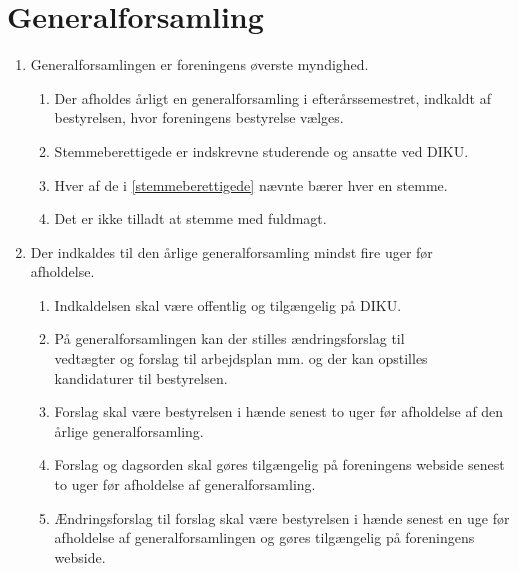 \documentclass[a4paper]{article}
\newenvironment{stykenum}{
  \begin{enumerate}[%
    label=Stk.~\arabic*., ref=\theenumi~Stk.~\arabic*, start=2]
}{\end{enumerate}}
\begin{document}
\section*{Generalforsamling}

\begin{enumerate}[resume*=afsnit]

\item Generalforsamlingen er foreningens øverste myndighed.

  \begin{stykenum}

  \item Der afholdes årligt en generalforsamling i efterårssemestret, indkaldt
        af bestyrelsen, hvor foreningens bestyrelse vælges.

  \item \label{stemmeberettigede} Stemmeberettigede er indskrevne studerende og
        ansatte ved DIKU.

  \item Hver af de i \ref{stemmeberettigede} nævnte bærer hver en stemme.

  \item Det er ikke tilladt at stemme med fuldmagt.

  \end{stykenum}

\item Der indkaldes til den årlige generalforsamling mindst fire uger før\\ afholdelse.

  \begin{stykenum}

  \item Indkaldelsen skal være offentlig og tilgængelig på DIKU.

  \item På generalforsamlingen kan der stilles ændringsforslag til\\vedtægter og
        forslag til arbejdsplan mm. og der kan opstilles\\kandidaturer til
        bestyrelsen.

  \item Forslag skal være bestyrelsen i hænde senest to uger før afholdelse af
        den årlige generalforsamling.

  \item Forslag og dagsorden skal gøres tilgængelig på foreningens webside
        senest to uger før afholdelse af generalforsamling.

  \item Ændringsforslag til forslag skal være bestyrelsen i hænde senest en uge
        før afholdelse af generalforsamlingen og gøres tilgængelig på
        foreningens webside.


\end{stykenum}
\end{enumerate}
\end{document}
